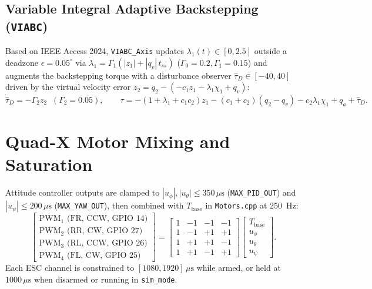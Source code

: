 \documentclass[11pt,a4paper]{article}
\begin{document}
\subsection{Variable Integral Adaptive Backstepping (\texttt{VIABC})}
Based on IEEE Access 2024, \texttt{VIABC\_Axis} updates $\lambda_1(t) \in [0, 2.5]$ outside a deadzone $\epsilon = 0.05^\circ$ via $\dot{\lambda}_1 = \Gamma_1(|z_1| + |q_v|\,t_{ss})$ ($\Gamma_0 = 0.2, \Gamma_1 = 0.15$) and augments the backstepping torque with a disturbance observer $\hat{\tau}_D \in [-40, 40]$ driven by the virtual velocity error $z_2 = q_2 - (-c_1 z_1 - \lambda_1\chi_1 + q_v)$:
\begin{equation}
  \dot{\hat{\tau}}_D = -\Gamma_2 z_2 \;\;(\Gamma_2 = 0.05), \qquad
  \tau = -(1 + \lambda_1 + c_1 c_2)z_1 - (c_1 + c_2)(q_2 - q_v) - c_2\lambda_1\chi_1 + q_a + \hat{\tau}_D.
\end{equation}

\section{Quad-X Motor Mixing and Saturation}

Attitude controller outputs are clamped to $|u_\phi|, |u_\theta| \le 350\,\mu\text{s}$ (\texttt{MAX\_PID\_OUT}) and $|u_\psi| \le 200\,\mu\text{s}$ (\texttt{MAX\_YAW\_OUT}), then combined with $T_{\text{base}}$ in \texttt{Motors.cpp} at 250~Hz:
\begin{equation}
  \begin{bmatrix} \text{PWM}_1\text{ (FR, CCW, GPIO 14)} \\ \text{PWM}_2\text{ (RR, CW, GPIO 27)} \\ \text{PWM}_3\text{ (RL, CCW, GPIO 26)} \\ \text{PWM}_4\text{ (FL, CW, GPIO 25)} \end{bmatrix}
  =
  \begin{bmatrix}
    1 & -1 & -1 & -1 \\
    1 & -1 & +1 & +1 \\
    1 & +1 & +1 & -1 \\
    1 & +1 & -1 & +1
  \end{bmatrix}
  \begin{bmatrix} T_{\text{base}} \\ u_\phi \\ u_\theta \\ u_\psi \end{bmatrix}.
\end{equation}
Each ESC channel is constrained to $[1080, 1920]\,\mu\text{s}$ while armed, or held at $1000\,\mu\text{s}$ when disarmed or running in \texttt{sim\_mode}.
\end{document}
